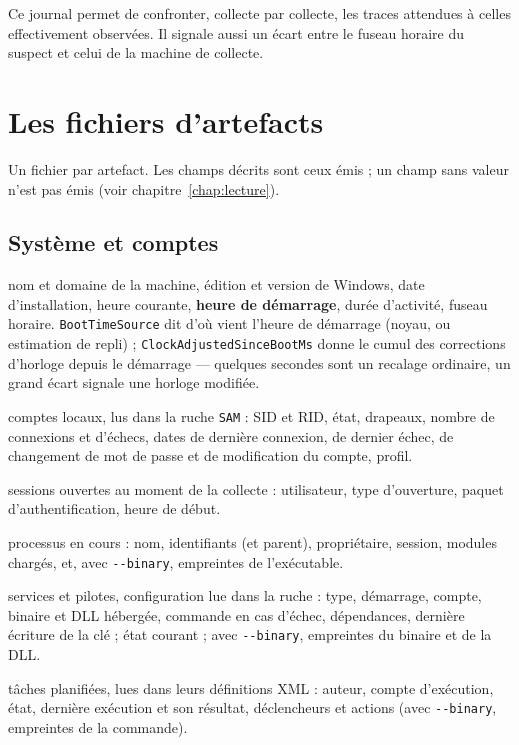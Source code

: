 \documentclass[11pt,a4paper,oneside]{report}
\newcommand{\opt}[1]{\texttt{-{}-#1}}
\newcommand{\champ}[1]{\texttt{#1}}
\newcommand{\fichier}[1]{\texttt{#1}}
\begin{document}
Ce journal permet de confronter, collecte par collecte, les traces attendues à
celles effectivement observées. Il signale aussi un écart entre le fuseau horaire
du suspect et celui de la machine de collecte.

\section{Les fichiers d'artefacts}

Un fichier par artefact. Les champs décrits sont ceux émis ; un champ sans valeur
n'est pas émis (voir chapitre~\ref{chap:lecture}).

\subsection{Système et comptes}

\begin{description}[style=nextline,leftmargin=1.2em]
  \item[\fichier{OperatingSystem.json}] nom et domaine de la machine, édition et
        version de Windows, date d'installation, heure courante, \textbf{heure de
        démarrage}, durée d'activité, fuseau horaire.
        \champ{BootTimeSource} dit d'où vient l'heure de démarrage (noyau, ou
        estimation de repli) ; \champ{ClockAdjustedSinceBootMs} donne le cumul des
        corrections d'horloge depuis le démarrage — quelques secondes sont un
        recalage ordinaire, un grand écart signale une horloge modifiée.
  \item[\fichier{users.json}] comptes locaux, lus dans la ruche \fichier{SAM} :
        SID et RID, état, drapeaux, nombre de connexions et d'échecs, dates de
        dernière connexion, de dernier échec, de changement de mot de passe et de
        modification du compte, profil.
  \item[\fichier{Sessions.json}] sessions ouvertes au moment de la collecte :
        utilisateur, type d'ouverture, paquet d'authentification, heure de début.
  \item[\fichier{processes.json}] processus en cours : nom, identifiants (et
        parent), propriétaire, session, modules chargés, et, avec \opt{binary},
        empreintes de l'exécutable.
  \item[\fichier{services.json}] services et pilotes, configuration lue dans la
        ruche : type, démarrage, compte, binaire et DLL hébergée, commande en cas
        d'échec, dépendances, dernière écriture de la clé ; état courant ; avec
        \opt{binary}, empreintes du binaire et de la DLL.
  \item[\fichier{ScheduledTasks.json}] tâches planifiées, lues dans leurs
        définitions XML : auteur, compte d'exécution, état, dernière exécution et
        son résultat, déclencheurs et actions (avec \opt{binary}, empreintes de la
        commande).
\end{description}
\end{document}
